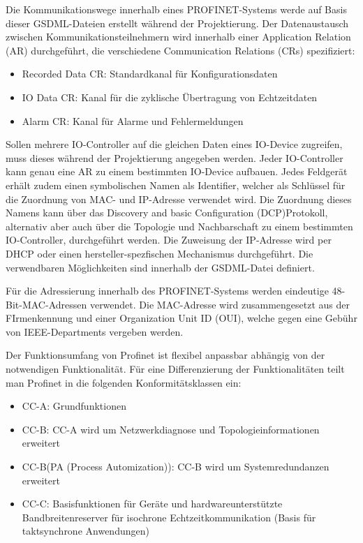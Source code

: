 Die Kommunikationswege innerhalb eines PROFINET-Systems werde auf Basis dieser GSDML-Dateien erstellt während der Projektierung. Der Datenaustausch zwischen Kommunikationsteilnehmern wird innerhalb einer Application Relation (AR) durchgeführt, die verschiedene Communication Relations (CRs) spezifiziert:
\begin{itemize}
\item Recorded Data CR: Standardkanal für Konfigurationsdaten
\item IO Data CR: Kanal für die zyklische Übertragung von Echtzeitdaten
\item Alarm CR: Kanal für Alarme und Fehlermeldungen
\end{itemize}

Sollen mehrere IO-Controller auf die gleichen Daten eines IO-Device zugreifen, muss dieses während der Projektierung angegeben werden. Jeder IO-Controller kann genau eine AR zu einem bestimmten IO-Device aufbauen. Jedes Feldgerät erhält zudem einen symbolischen Namen als Identifier, welcher als Schlüssel für die Zuordnung von MAC- und IP-Adresse verwendet wird. Die Zuordnung dieses Namens kann über das \glqq Discovery and basic Configuration (DCP)\grqq Protokoll, alternativ aber auch über die Topologie und Nachbarschaft zu einem bestimmten IO-Controller, durchgeführt werden. Die Zuweisung der IP-Adresse wird per DHCP oder einen hersteller-spezfischen Mechanismus durchgeführt. Die verwendbaren Möglichkeiten sind innerhalb der GSDML-Datei definiert.

Für die Adressierung innerhalb des PROFINET-Systems werden eindeutige 48-Bit-MAC-Adressen verwendet. Die MAC-Adresse wird zusammengesetzt aus der FIrmenkennung und einer Organization Unit ID (OUI), welche gegen eine Gebühr von IEEE-Departments vergeben werden.


Der Funktionsumfang von Profinet ist flexibel anpassbar abhängig von der notwendigen Funktionalität. Für eine Differenzierung der Funktionalitäten teilt man Profinet in die folgenden Konformitätsklassen ein:
\begin{itemize}
\item CC-A: Grundfunktionen
\item CC-B: CC-A wird um Netzwerkdiagnose und Topologieinformationen erweitert
\item CC-B(PA (Process Automization)): CC-B wird um Systemredundanzen erweitert
\item CC-C: Basisfunktionen für Geräte und hardwareunterstützte Bandbreitenreserver für isochrone Echtzeitkommunikation (Basis für taktsynchrone Anwendungen)
\end{itemize}


